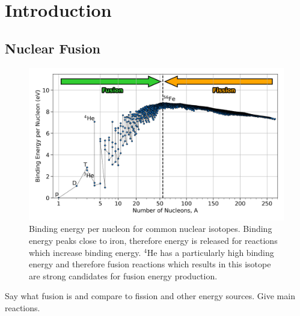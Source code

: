 \chapter{Introduction} \label{chap:intro}


\section{Nuclear Fusion}%
\label{sec:intro_whatisfusion}

\begin{figure}[t!]
    \includegraphics[width=0.9\linewidth]{Introduction/Images/BE_per_nucleon.png}
    \centering
    \caption{Binding energy per nucleon for common nuclear isotopes.
    Binding energy peaks close to iron, therefore energy is released for reactions which increase binding energy.
    ${}^{4}\text{He}$ has a particularly high binding energy and therefore fusion reactions which results in this isotope are strong candidates for fusion energy production.
    }%
    \label{fig:intro_BEperNucleon}
\end{figure}

Say what fusion is and compare to fission and other energy sources.
Give main reactions.

